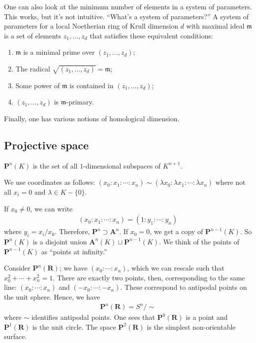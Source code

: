 \documentclass [11 pt, oneside, margin = 1 in] {article}
\begin{document}
One can also look at the minimum number of elements in a system of parameters. This works, but it's not intuitive. ``What's a system of parameters?'' A system of parameters for a local Noetherian ring of Krull dimension $d$ with maximal ideal $\mathfrak{m}$ is a set of elements $z_1,\hdots, z_d$ that satisfies these equivalent conditions:
\begin{enumerate}
	\item $\mathfrak{m}$ is a minimal prime over $(z_1,\hdots, z_d)$;
	\item The radical $\sqrt{(z_1,\hdots, z_d)}=\mathfrak{m} $;
	\item Some power of $\mathfrak{m}$ is contained in $(z_1,\hdots, z_d)$;
	\item $(z_1,\hdots, z_d)$ is $\mathfrak{m}$-primary.
\end{enumerate}

Finally, one has various notions of homological dimension.

\subsection{Projective space}
\begin{definition}[ ]\label{}\text{}
 $\mathbf{P}^n(K)$ is the set of all $1$-dimensional subspaces of $K^{n+1}$.
\end{definition}

We use coordinates as follows: $(x_0:x_1:\cdots : x_n)\sim (\lambda x_0:\lambda x_1:\cdots:\lambda x_n)$ where not all $x_i=0$ and $\lambda\in K - \{0\}$.

If $x_0\ne 0$, we can write
\begin{align*}
	(x_0:x_1:\cdots:x_n) = (1:y_1:\cdots : y_n)
\end{align*}
where $y_i = x_i/x_0$. Therefore, $\mathbf{P}^n \supset \mathbf{A}^n$. If $x_0=0$, we get a copy of $\mathbf{P}^{n-1}(K)$. So $\mathbf{P}^n(K)$ is a disjoint union $\mathbf{A}^n(K) \sqcup \mathbf{P}^{n-1}(K) $. We think of the points of $\mathbf{P}^{n-1}(K)$ as ``points at infinity.''

Consider $\mathbf{P}^n(\mathbf{R})$; we have $(x_0:\cdots:x_n)$, which we can rescale such that $x_0^2 +\cdots+x_n^2 = 1$. There are exactly two points, then, corresponding to the same line: $(x_0:\cdots:x_n)$ and $(-x_0:\cdots:-x_n)$. These correspond to antipodal points on the unit sphere. Hence, we have
\begin{align*}
	\mathbf{P}^n(\mathbf{R}) = S^n / \sim
\end{align*}
where $\sim$ identifies antipodal points. One sees that $\mathbf{P}^0(\mathbf{R})$ is a point and $\mathbf{P}^1(\mathbf{R})$ is the unit circle. The space $\mathbf{P}^2(\mathbf{R})$ is the simplest non-orientable surface.
\end{document}
